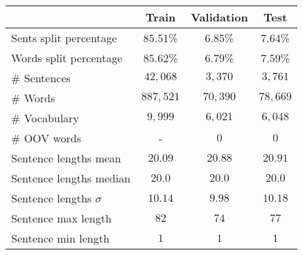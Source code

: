 \begin{tabular}{lccc}
    \toprule
    & \textbf{Train} & \textbf{Validation} & \textbf{Test} \\
    \midrule
    Sents split percentage & 
    \(85.51\)\% & \(6.85\)\% & \(7.64\)\%  \\
    Words split percentage & 
    \(85.62\)\% & \(6.79\)\% & \(7.59\)\%  \\
    \# Sentences & 
    \(42,068\) & \(3,370\) & \(3,761\) \\
    \# Words & 
    \(887,521\) & \(70,390\) & \(78,669\) \\ 
    \# Vocabulary & 
    \(9,999\) & \(6,021\) & \(6,048\) \\
    \# OOV words & 
    - & \(0\) & \(0\) \\
    \midrule
    Sentence lengths mean & 
    \(20.09\) & \(20.88\) & \(20.91\) \\
    Sentence lengths median & 
    \(20.0\) & \(20.0\) & \(20.0\) \\
    Sentence lengths \(\sigma\) &
    \(10.14\) & \(9.98\) & \(10.18\) \\
    Sentence max length & 
    \(82\) & \(74\) & \(77\) \\
    Sentence min length & 
    \(1\) & \(1\) & \(1\) \\

    \bottomrule
\end{tabular}